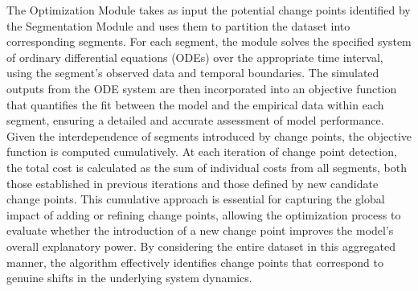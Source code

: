 \documentclass[10pt,letterpaper]{article}
\begin{document}
The Optimization Module takes as input the potential change points identified by the Segmentation Module and uses them to partition the dataset into corresponding segments. For each segment, the module solves the specified system of ordinary differential equations (ODEs) over the appropriate time interval, using the segment's observed data and temporal boundaries. The simulated outputs from the ODE system are then incorporated into an objective function that quantifies the fit between the model and the empirical data within each segment, ensuring a detailed and accurate assessment of model performance.\\
Given the interdependence of segments introduced by change points, the objective function is computed cumulatively. At each iteration of change point detection, the total cost is calculated as the sum of individual costs from all segments, both those established in previous iterations and those defined by new candidate change points. This cumulative approach is essential for capturing the global impact of adding or refining change points, allowing the optimization process to evaluate whether the introduction of a new change point improves the model's overall explanatory power. By considering the entire dataset in this aggregated manner, the algorithm effectively identifies change points that correspond to genuine shifts in the underlying system dynamics.
\end{document}

